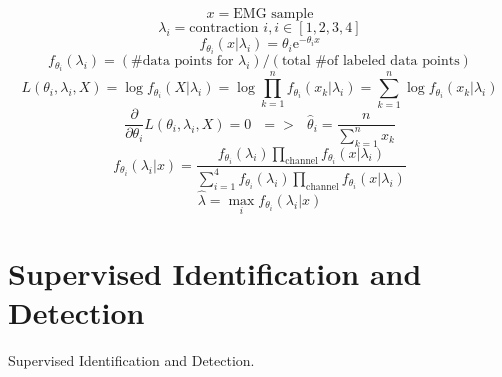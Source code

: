 \documentclass[times, 10pt,twocolumn]{article}
\begin{document}
\begin{equation}
x = \text{EMG sample}
\end{equation}
\begin{equation}
\lambda_i = \text{contraction }i, i\in[1,2,3,4]
\end{equation}
\begin{equation}
f_{\theta_i}(x|\lambda_i) = \theta_i\mathrm{e}^{-\theta_ix}
\end{equation}
\begin{equation}
f_{\theta_i}(\lambda_i) = (\text{\# data points for }\lambda_i)/(\text{total \# of labeled data points})
\end{equation}
\begin{equation}
L(\theta_i,\lambda_i,X) = \log{f_{\theta_i}(X|\lambda_i)} = \log{\prod_{k=1}^{n}f_{\theta_i}(x_k|\lambda_i)} = \sum_{k=1}^{n}\log{f_{\theta_i}(x_k|\lambda_i)}
\end{equation}
\begin{equation}
\frac{\partial}{\partial{\theta_i}}L(\theta_i,\lambda_i,X) = 0 \text{ } => \text{ } \hat{\theta}_i = \frac{n}{\sum_{k=1}^{n}x_k}
\end{equation}
\begin{equation}
f_{\theta_i}(\lambda_i|x) = \frac{f_{\theta_i}(\lambda_i)\prod_{\text{channel}}f_{\theta_i}(x|\lambda_i)}{\sum_{i=1}^{4}f_{\theta_i}(\lambda_i)\prod_{\text{channel}}f_{\theta_i}(x|\lambda_i)}
\end{equation}
\begin{equation}
\hat{\lambda} = \max_{i}f_{\theta_i}(\lambda_i|x)
\end{equation}

\section{Supervised Identification and Detection}

Supervised Identification and Detection.
\end{document}

